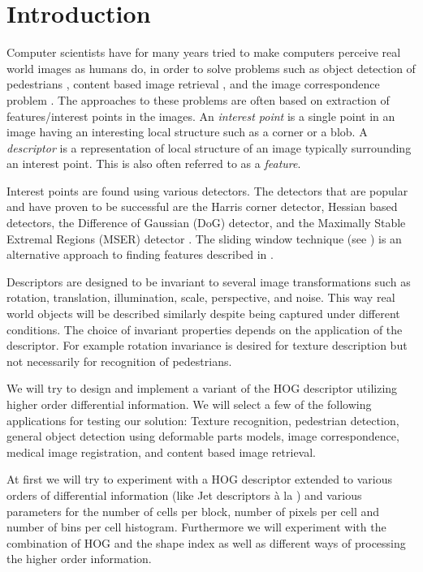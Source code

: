 \documentclass[thesis.tex]{subfiles}
\begin{document}
\section*{Introduction}

Computer scientists have for many years tried to make computers perceive real world images as humans do, in order to solve problems such as object detection of pedestrians \cite{felzenszwalb2008discriminatively}, content based image retrieval \cite{smeulders2000content}, and the image correspondence problem \cite{dahl2011finding}.
%
The approaches to these problems are often based on extraction of features/interest points in the images. An \emph{interest point} is a single point in an image having an interesting local structure such as a corner or a blob. A \emph{descriptor} is a representation of local structure of an image typically surrounding an interest point. This is also often referred to as a \emph{feature}.

Interest points are found using various detectors. The detectors that are popular and have proven to be successful are the Harris corner detector, Hessian based detectors, the Difference of Gaussian (DoG) detector, and the Maximally Stable Extremal Regions (MSER) detector \cite{aanaes2012interesting,dahl2011finding}. The sliding window technique (see ) is an alternative approach to finding features described in \cite{dalal2005histograms}.

Descriptors are designed to be invariant to several image transformations such as rotation, translation, illumination, scale, perspective, and noise. This way real world objects will be described similarly despite being captured under different conditions. The choice of invariant properties depends on the application of the descriptor. For example rotation invariance is desired for texture description but not necessarily for recognition of pedestrians.

We will try to design and implement a variant of the HOG descriptor utilizing higher order differential information. We will select a few of the following applications for testing our solution: Texture recognition, pedestrian detection, general object detection using deformable parts models, image correspondence, medical image registration, and content based image retrieval.

At first we will try to experiment with a HOG descriptor extended to various orders of differential information (like Jet descriptors à la \cite{larsen2012jet}) and various parameters for the number of cells per block, number of pixels per cell and number of bins per cell histogram. Furthermore we will experiment with the combination of HOG and the shape index \cite{koenderink1992surface} as well as different ways of processing the higher order information.



\subbibliography
\end{document}

